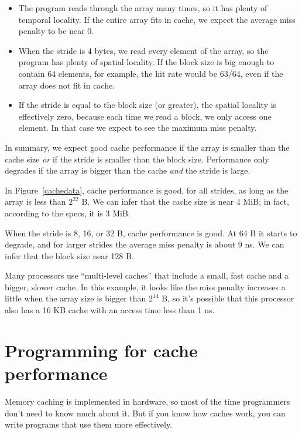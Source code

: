 \documentclass[12pt]{book}
\begin{document}
\begin{itemize}

\item The program reads through the array many times, so it has plenty
  of temporal locality.  If the entire array fits in cache, we expect
  the average miss penalty to be near 0.

\item When the stride is 4 bytes, we read every element of the array,
  so the program has plenty of spatial locality.  If the block size is
  big enough to contain 64 elements, for example, the hit rate would
  be 63/64, even if the array does not fit in cache.

\item If the stride is equal to the block size (or greater), the
  spatial locality is effectively zero, because each time we read a
  block, we only access one element.  In that case we expect to see
  the maximum miss penalty.

\end{itemize}

In summary, we expect good cache performance if the array is smaller
than the cache size {\em or} if the stride is smaller than the block
size.  Performance only degrades if the array is bigger than the
cache {\em and} the stride is large.

In Figure~\ref{cachedata}, cache performance is good, for all strides,
as long as the array is less than $2^{22}$ B.  We can infer that the
cache size is near 4 MiB; in fact, according to the specs, it is 3
MiB.

When the stride is 8, 16, or 32 B, cache performance is good.  At 64 B
it starts to degrade, and for larger strides the average miss
penalty is about 9 ns.  We can infer that the block size near 128 B.

Many processors use ``multi-level caches'' that include a small,
fast cache and a bigger, slower cache.  In this example, it looks 
like the miss penalty increases a little when the array size is bigger
than $2^{14}$ B, so it's possible that this processor also has a 16 KB
cache with an access time less than 1 ns.


\section{Programming for cache performance}

Memory caching is implemented in hardware, so most of the time
programmers don't need to know much about it.  But if you know how
caches work, you can write programs that use them more effectively.
\end{document}

